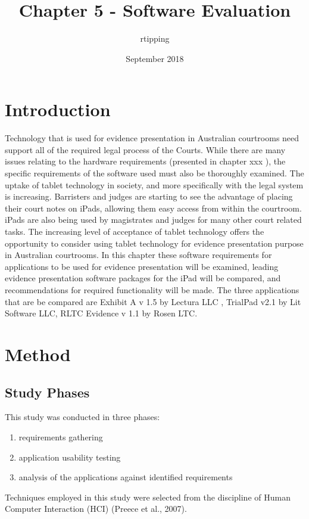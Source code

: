 \documentclass{article}
\title{Chapter 5 - Software Evaluation}
\author{rtipping }
\date{September 2018}
\begin{document}
\maketitle
\tableofcontents
\section{Introduction}
\doublespace
Technology that is used for evidence presentation in Australian courtrooms need support all of the required legal process of the Courts. While there are many issues relating to the hardware requirements (presented in chapter
\color{red} xxx 
\color{black} ), the specific requirements of the software used must also be thoroughly examined. The uptake of tablet technology in society, and more specifically with the legal system is increasing.
Barristers and judges are starting to see the advantage of placing their court notes on iPads, allowing them easy access from within the courtroom. iPads are also being used by magistrates and judges for many other court related tasks. The increasing level of acceptance of tablet technology offers the opportunity to consider using tablet technology for evidence presentation purpose in Australian courtrooms.
In this chapter these software requirements for applications to be used for evidence presentation will be examined, leading evidence presentation software packages for the iPad will be compared, and recommendations for required functionality will be made.
The three applications that are be compared are Exhibit A v 1.5 by Lectura LLC ,  TrialPad v2.1 by Lit Software LLC, RLTC Evidence v 1.1 by Rosen LTC.


\section{Method}
\subsection{Study Phases}
This study was conducted in three phases:
\begin{enumerate}
    \item requirements gathering
    \item application usability testing
    \item analysis of the applications against identified requirements
\end{enumerate} 
Techniques employed in this study were selected from the discipline of Human Computer Interaction (HCI) \color{green}(Preece et al., 2007).
\color{black}
\end{document}
